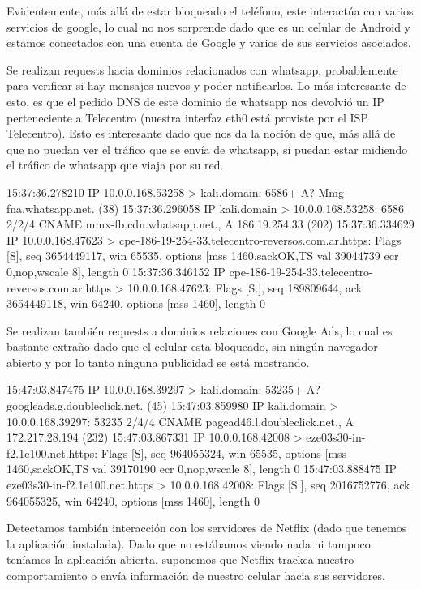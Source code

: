 Evidentemente, más allá de estar bloqueado el teléfono, este interactúa con varios servicios de google, lo cual no nos sorprende dado que es un celular de Android y estamos conectados con una cuenta de Google y varios de sus servicios asociados.

Se realizan requests hacia dominios relacionados con whatsapp, probablemente para verificar si hay mensajes nuevos y poder notificarlos. Lo más interesante de esto, es que el pedido DNS de este dominio de whatsapp nos devolvió un IP perteneciente a Telecentro (nuestra interfaz eth0 está proviste por el ISP Telecentro). Esto es interesante dado que nos da la noción de que, más allá de que no puedan ver el tráfico que se envía de whatsapp, si puedan estar midiendo el tráfico de whatsapp que viaja por su red.

15:37:36.278210 IP 10.0.0.168.53258 > kali.domain: 6586+ A? Mmg-fna.whatsapp.net. (38)
15:37:36.296058 IP kali.domain > 10.0.0.168.53258: 6586 2/2/4 CNAME mmx-fb.cdn.whatsapp.net., A 186.19.254.33 (202)
15:37:36.334629 IP 10.0.0.168.47623 > cpe-186-19-254-33.telecentro-reversos.com.ar.https: Flags [S], seq 3654449117, win 65535, options [mss 1460,sackOK,TS val 39044739 ecr 0,nop,wscale 8], length 0
15:37:36.346152 IP cpe-186-19-254-33.telecentro-reversos.com.ar.https > 10.0.0.168.47623: Flags [S.], seq 189809644, ack 3654449118, win 64240, options [mss 1460], length 0

Se realizan también requests a dominios relaciones con Google Ads, lo cual es bastante extraño dado que el celular esta bloqueado, sin ningún navegador abierto y por lo tanto ninguna publicidad se está mostrando.

15:47:03.847475 IP 10.0.0.168.39297 > kali.domain: 53235+ A? googleads.g.doubleclick.net. (45)
15:47:03.859980 IP kali.domain > 10.0.0.168.39297: 53235 2/4/4 CNAME pagead46.l.doubleclick.net., A 172.217.28.194 (232)
15:47:03.867331 IP 10.0.0.168.42008 > eze03s30-in-f2.1e100.net.https: Flags [S], seq 964055324, win 65535, options [mss 1460,sackOK,TS val 39170190 ecr 0,nop,wscale 8], length 0
15:47:03.888475 IP eze03s30-in-f2.1e100.net.https > 10.0.0.168.42008: Flags [S.], seq 2016752776, ack 964055325, win 64240, options [mss 1460], length 0

Detectamos también interacción con los servidores de Netflix (dado que tenemos la aplicación instalada). Dado que no estábamos viendo nada ni tampoco teníamos la aplicación abierta, suponemos que Netflix trackea nuestro comportamiento o envía información de nuestro celular hacia sus servidores.

